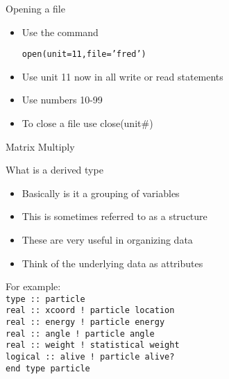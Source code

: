 \documentclass{beamer}
\begin{document}
\begin{frame}{Opening a file}

  \begin{itemize}
    \item Use the  command
    \vfill
    \begin{center}
      \texttt{open(unit=11,file='fred')}
    \end{center}
    \vfill\item Use unit 11 now in all write or read statements
    \vfill\item Use numbers 10-99
    \vfill\item To close a file use close(unit\#)
  \end{itemize}

\end{frame}
\begin{frame}[allowframebreaks]{Matrix Multiply}
\begin{scriptsize}
  
\end{scriptsize}
\end{frame}
\begin{frame}{What is a derived type}

  \begin{itemize}
    \item Basically is it a grouping of variables
    \vfill\item This is sometimes referred to as a structure
    \vfill\item These are very useful in organizing data
    \vfill\item Think of the underlying data as attributes
  \end{itemize}
  \vfill
  For example: \\
  \texttt{type :: particle} \\
    \hspace{0.1cm} \texttt{real :: xcoord ! particle location} \\
    \hspace{0.1cm} \texttt{real :: energy ! particle energy} \\
    \hspace{0.1cm} \texttt{real :: angle  ! particle angle} \\
    \hspace{0.1cm} \texttt{real :: weight ! statistical weight} \\
    \hspace{0.1cm} \texttt{logical :: alive ! particle alive?} \\
  \texttt{end type particle}
\end{frame}
\end{document}
